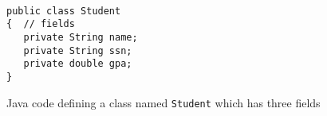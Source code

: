 





\begin {figure}


\begin{verbatim}

public class Student
{  // fields
   private String name;
   private String ssn;
   private double gpa;
}
\end{verbatim}

\caption {Java code defining a class named
\texttt {Student} which has three fields }
\label {fig:class}

\end {figure}



